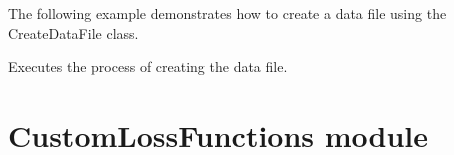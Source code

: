 \documentclass[letterpaper,10pt,english]{sphinxmanual}
\begin{document}
\begin{fulllineitems}
\begin{description}
\sphinxAtStartPar
The following example demonstrates how to create a data file using the CreateDataFile class.

\begin{sphinxVerbatim}[commandchars=\\\{\}]
    
\end{sphinxVerbatim}

\end{description}

\begin{fulllineitems}
\label{\detokenize{CreateDataFile:CreateDataFile.CreateDataFile.execute}}
\pysigstartsignatures
{}
\pysigstopsignatures
\sphinxAtStartPar
Executes the process of creating the data file.

\end{fulllineitems}


\end{fulllineitems}


\sphinxstepscope


\section{CustomLossFunctions module}
\label{\detokenize{CustomLossFunctions:module-CustomLossFunctions}}\label{\detokenize{CustomLossFunctions:customlossfunctions-module}}\label{\detokenize{CustomLossFunctions::doc}}
\end{document}
